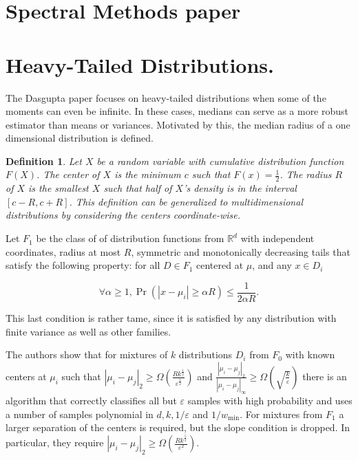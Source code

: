 \documentclass[11pt,letter]{article}
\newtheorem{definition}{Definition}
\begin{document}
\section{Spectral Methods paper}

\section{Heavy-Tailed Distributions.}

The Dasgupta paper \cite{1530741} focuses on heavy-tailed distributions when some of the  moments can even be infinite. In these cases, medians can serve as a more robust estimator than means or variances. Motivated by this, the median radius of a one dimensional distribution is defined. 

\begin{definition}
Let $X$ be a random variable with cumulative distribution function $F(X)$. The center of $X$ is the minimum $c$ such that $F(x) = \frac{1}{2}$. The radius $R$ of $X$ is the smallest $X$ such that half of $X$'s density is in the interval $[c-R, c+R]$. This definition can be generalized to multidimensional distributions by considering the centers coordinate-wise. 
\end{definition}

Let $F_1$ be the class of of distribution functions from $\mathbb{R}^d$ with independent coordinates, radius at most $R$, symmetric and monotonically decreasing tails that satisfy the following property: for all $D \in F_1$ centered at ${\mu}$, and any $x \in D_i$ 

$$ \forall \alpha \geq 1, \Pr{(|x-\mu_i| \geq \alpha R)} \leq \frac{1}{2\alpha R}. $$

This last condition is rather tame, since it is satisfied by any distribution with finite variance as well as other families. 

The authors show that for mixtures of $k$ distributions $D_i$ from $F_0$ with known centers at $\mu_i$ such that $| \mu_i - \mu_j |_2 \geq \Omega\left(\frac{Rk^\frac{1}{2}}{\varepsilon^{\frac{1}{2}}} \right)$ and $\frac{|\mu_i - \mu_j|_2}{|\mu_i-\mu_j|_{\infty}} \geq \Omega{\left( \sqrt{\frac{k}{\varepsilon}}\right)}$ there is an algorithm that correctly classifies all but $\varepsilon$ samples with high probability and uses a number of samples polynomial in $d, k, 1/\varepsilon$ and $1/w_{\min}$. For mixtures from $F_1$ a larger separation of the centers is required, but the slope condition is dropped. In particular, they require $|\mu_i - \mu_j |_2 \geq \Omega \left(\frac{Rk^{\frac{5}{2}}}{\varepsilon^{2}}\right)$. 
\end{document}
